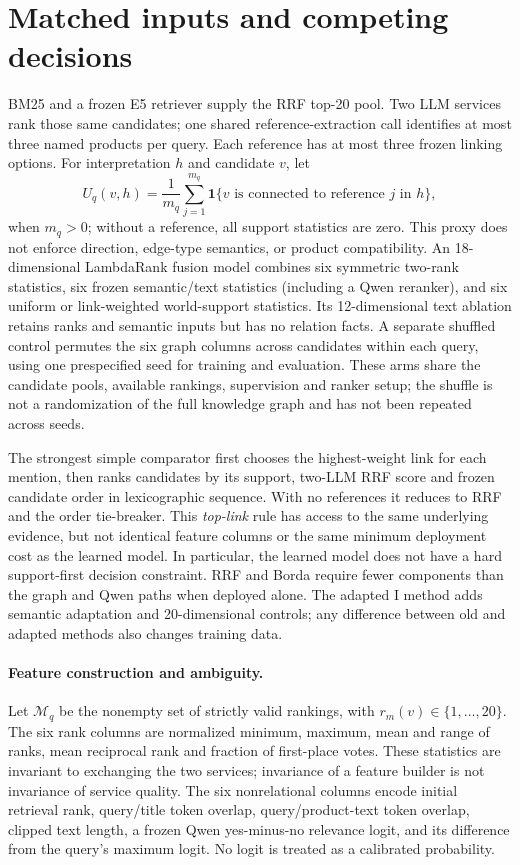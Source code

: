 \documentclass{article}
\begin{document}
\section{Matched inputs and competing decisions}
BM25 and a frozen E5 retriever supply the RRF top-20 pool. Two LLM services
rank those same candidates; one shared reference-extraction call identifies
at most three named products per query. Each reference has at most three
frozen linking options. For interpretation $h$ and candidate $v$, let
\begin{equation}
 U_q(v,h)=\frac{1}{m_q}\sum_{j=1}^{m_q}
 \mathbf{1}\{\text{$v$ is connected to reference $j$ in $h$}\},
\end{equation}
when $m_q>0$; without a reference, all support statistics are zero. This
proxy does not enforce direction, edge-type semantics, or product compatibility.
An 18-dimensional LambdaRank fusion model \citep{lightgbm} combines six symmetric
two-rank statistics, six frozen semantic/text statistics (including a Qwen
reranker), and six uniform or link-weighted world-support statistics. Its
12-dimensional text ablation retains ranks and semantic inputs but has no
relation facts. A separate shuffled control permutes the six graph columns
across candidates within each query, using one prespecified seed for training
and evaluation. These arms share the candidate pools, available rankings,
supervision and ranker setup; the shuffle is not a randomization of the full
knowledge graph and has not been repeated across seeds.

The strongest simple comparator first chooses the highest-weight link for
each mention, then ranks candidates by its support, two-LLM RRF score and
frozen candidate order in lexicographic sequence. With no references it
reduces to RRF and the order tie-breaker. This \emph{top-link} rule has access
to the same underlying evidence, but not identical feature columns or the
same minimum deployment cost as the learned model. In particular, the learned
model does not have a hard support-first decision constraint. RRF and Borda
require fewer components than the graph and Qwen paths when deployed alone.
The adapted I method adds semantic adaptation and 20-dimensional controls;
any difference between old and adapted methods also changes training data.

\paragraph{Feature construction and ambiguity.}
Let $\mathcal M_q$ be the nonempty set of strictly valid rankings, with
$r_m(v)\in\{1,\ldots,20\}$. The six rank columns are normalized minimum,
maximum, mean and range of ranks, mean reciprocal rank and fraction of
first-place votes. These statistics are invariant to exchanging the two
services; invariance of a feature builder is not invariance of service
quality. The six nonrelational columns encode initial retrieval rank,
query/title token overlap, query/product-text token overlap, clipped text
length, a frozen Qwen yes-minus-no relevance logit, and its difference
from the query's maximum logit. No logit is treated as a calibrated
probability.
\end{document}

